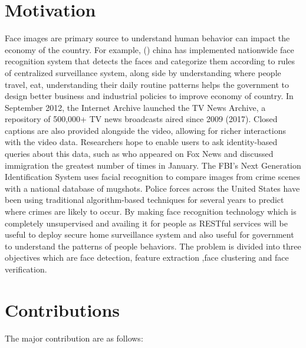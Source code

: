\documentclass[a4paper,12pt, twoside]{NITKReport}
\begin{document}
	\section{Motivation}
	\label{moti}
	Face images are primary source to understand human behavior can impact the economy of the country. For example, (\cite{3}) china has implemented nationwide face recognition system that detects the faces and categorize them according to rules of centralized surveillance system, along side by understanding where people travel, eat, understanding their daily routine patterns helps the government to design better business and industrial policies to improve economy of country. 
In September 2012, the Internet Archive launched the TV News Archive, a repository of 500,000+ TV news broadcasts aired since 2009 (2017). Closed captions are also provided alongside the video, allowing for richer interactions with the video data. Researchers hope to enable users to ask identity-based queries about this data, such as who appeared on Fox News and discussed immigration the greatest number of times in January. The FBI’s Next Generation Identification System uses facial recognition to compare images from crime scenes with a national database of mugshots. Police forces across the United States have been using traditional algorithm-based techniques for several years to predict where crimes are likely to occur. By making face recognition technology which is completely unsupervised and availing it for people as RESTful services will be useful to deploy secure home surveillance system and also useful for government to understand the patterns of people behaviors. The problem is divided into three objectives which are face detection, feature extraction ,face clustering and face verification.

	
\section{Contributions}
\label{contri}
 The major contribution are as follows:
  
\end{document}
